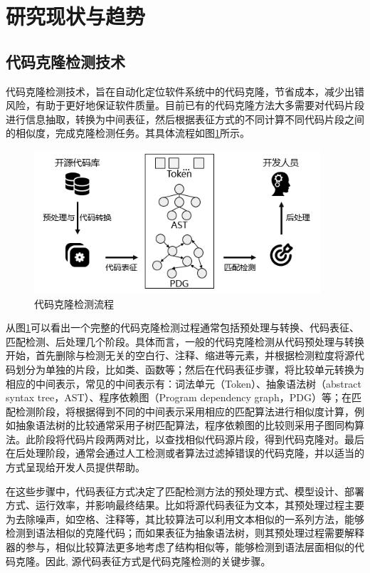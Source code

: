 \section{研究现状与趋势}

\subsection{代码克隆检测技术}

代码克隆检测技术，旨在自动化定位软件系统中的代码克隆，节省成本，减少出错风险，有助于更好地保证软件质量。目前已有的代码克隆方法大多需要对代码片段进行信息抽取，转换为中间表征，然后根据表征方式的不同计算不同代码片段之间的相似度，完成克隆检测任务。其具体流程如图\ref{fig:figure1}所示。
\begin{figure}[H]
    \centering
    \includegraphics[width=0.95\textwidth]{figures/figure1}
    \caption{代码克隆检测流程}\label{fig:figure1}
\end{figure}

从图\ref{fig:figure1}可以看出一个完整的代码克隆检测过程通常包括预处理与转换、代码表征、匹配检测、后处理几个阶段。具体而言，一般的代码克隆检测从代码预处理与转换开始，首先删除与检测无关的空白行、注释、缩进等元素，并根据检测粒度将源代码划分为单独的片段，比如类、函数等；然后在代码表征步骤，将比较单元转换为相应的中间表示，常见的中间表示有：词法单元（Token）、抽象语法树（abstract syntax tree，AST）、程序依赖图（Program dependency graph，PDG）等；在匹配检测阶段，将根据得到不同的中间表示采用相应的匹配算法进行相似度计算，例如抽象语法树的比较通常采用子树匹配算法，程序依赖图的比较则采用子图同构算法。此阶段将代码片段两两对比，以查找相似代码源片段，得到代码克隆对。最后在后处理阶段，通常会通过人工检测或者算法过滤掉错误的代码克隆，并以适当的方式呈现给开发人员提供帮助。

在这些步骤中，代码表征方式决定了匹配检测方法的预处理方式、模型设计、部署方式、运行效率，并影响最终结果\cite{陈秋远2019代码克隆检测研究进展}。比如将源代码表征为文本，其预处理过程主要为去除噪声，如空格、注释等，其比较算法可以利用文本相似的一系列方法，能够检测到语法相似的克隆代码；而如果表征为抽象语法树，则其预处理过程需要解释器的参与，相似比较算法更多地考虑了结构相似等，能够检测到语法层面相似的代码克隆。因此, 源代码表征方式是代码克隆检测的关键步骤。


